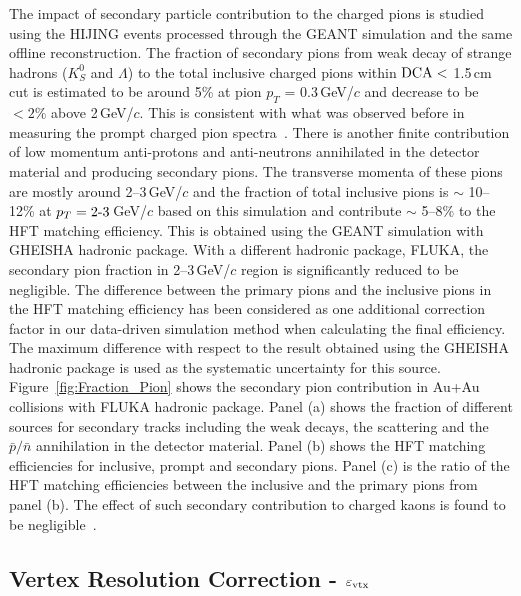 \documentclass[%
 reprint,	
 amsmath,amssymb,
 aps,
 prc,
]{revtex4-1}
\begin{document}
The impact of secondary particle contribution to the charged pions is studied using the HIJING events processed through the GEANT simulation and the same offline reconstruction. The fraction of secondary pions from weak decay of strange hadrons ($K^0_S$ and $\Lambda$) to the total inclusive charged pions within ${\rm DCA}<$ 1.5\,cm cut is estimated to be around 5\% at pion $p_{T}$ = 0.3\,GeV/$c$ and decrease to be $<2\%$ above 2\,GeV/$c$. This is consistent with what was observed before in measuring the prompt charged pion spectra~\cite{Adams:2003xp}. There is another finite contribution of low momentum anti-protons and anti-neutrons annihilated in the detector material and producing secondary pions. The transverse momenta of these pions are mostly around 2--3\,GeV/$c$ and the fraction of total inclusive pions is $\sim$ 10--12\% at $p_{T} =2\textup{-}3$\,GeV/$c$ based on this simulation and contribute $\sim$ 5--8\% to the HFT matching efficiency. This is obtained using the GEANT simulation with GHEISHA hadronic package. With a different hadronic package, FLUKA, the secondary pion fraction in 2--3\,GeV/$c$ region is significantly reduced to be negligible. The difference between the primary pions and the inclusive pions in the HFT matching efficiency has been considered as one additional correction factor in our data-driven simulation method when calculating the final efficiency. The maximum difference with respect to the result obtained using the GHEISHA hadronic package is used as the systematic uncertainty for this source. Figure~\ref{fig:Fraction_Pion} shows the secondary pion contribution in Au+Au collisions with FLUKA hadronic package. Panel (a) shows the fraction of different sources for secondary tracks including the weak decays, the scattering and the $\bar{p}/\bar{n}$ annihilation in the detector material. Panel (b) shows the HFT matching efficiencies for inclusive, prompt and secondary pions. Panel (c) is the ratio of the HFT matching efficiencies between the inclusive and the primary pions from panel (b). The effect of such secondary contribution to charged kaons is found to be negligible~\cite{Adams:2003xp}.

\subsection{Vertex Resolution Correction - $\varepsilon_{\rm vtx}$}
\label{correction:vtx}
\end{document}
